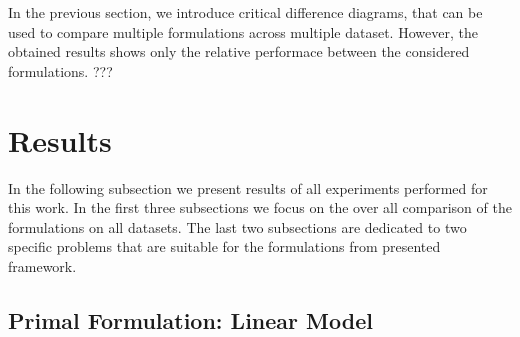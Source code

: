 In the previous section, we introduce critical difference diagrams, that can be used to compare multiple formulations across multiple dataset. However, the obtained results shows only the relative performace between the considered formulations. ???

\section{Results}

In the following subsection we present results of all experiments performed for this work. In the first three subsections we focus on the over all comparison of the formulations on all datasets. The last two subsections are dedicated to two specific problems that are suitable for the formulations from presented framework.

\subsection{Primal Formulation: Linear Model}

